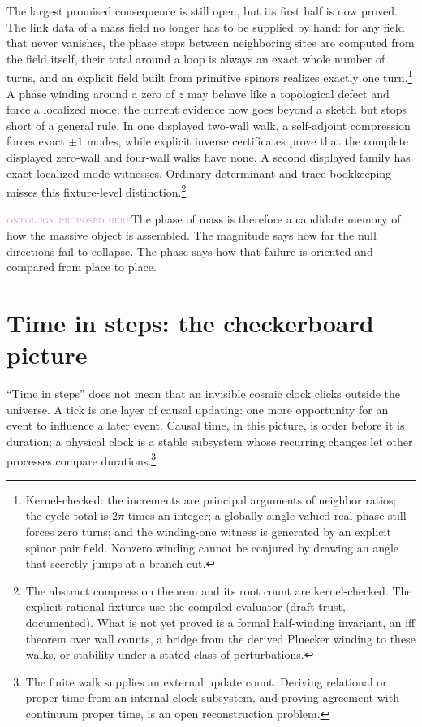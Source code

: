 \documentclass[11pt]{article}
\newcommand{\Olabel}{\textcolor{plum}{\textsc{ontology proposed here}}}
\begin{document}
The largest promised consequence is still open, but its first half is now
proved.  The link data of a mass field no longer has to be supplied by hand:
for any field that never vanishes, the phase steps between neighboring sites
are computed from the field itself, their total around a loop is always an
exact whole number of turns, and an explicit field built from primitive
spinors realizes exactly one turn.\footnote{Kernel-checked: the increments
are principal arguments of neighbor ratios; the cycle total is $2\pi$ times
an integer; a globally single-valued real phase still forces zero turns; and
the winding-one witness is generated by an explicit spinor pair field.
Nonzero winding cannot be conjured by drawing an angle that secretly jumps
at a branch cut.}  A phase winding around a zero of $z$ may behave like a
topological defect and force a localized mode; the current evidence now goes
beyond a sketch but stops short of a general rule.  In one displayed two-wall
walk, a self-adjoint compression forces exact $\pm1$ modes, while explicit
inverse certificates prove that the complete displayed zero-wall and
four-wall walks have none.  A second displayed family has exact localized
mode witnesses.  Ordinary determinant and trace bookkeeping misses this
fixture-level distinction.\footnote{The abstract compression theorem and its
root count are kernel-checked.  The explicit rational fixtures use the
compiled evaluator (draft-trust, documented).  What is not yet proved is a
formal half-winding invariant, an iff theorem over wall counts, a bridge from
the derived Pluecker winding to these walks, or stability under a stated class
of perturbations.}

\Olabel\quad The phase of mass is therefore a candidate memory of how the
massive object is assembled.  The magnitude says how far the null directions
fail to collapse.  The phase says how that failure is oriented and compared
from place to place.

\section{Time in steps: the checkerboard picture}
\label{sec:checkerboard}

``Time in steps'' does not mean that an invisible cosmic clock clicks outside
the universe.  A tick is one layer of causal updating: one more opportunity for
an event to influence a later event.  Causal time, in this picture, is order
before it is duration; a physical clock is a stable subsystem whose recurring
changes let other processes compare durations.\footnote{The finite walk
supplies an external update count.  Deriving relational or proper time from an
internal clock subsystem, and proving agreement with continuum proper time, is
an open reconstruction problem.}
\end{document}
